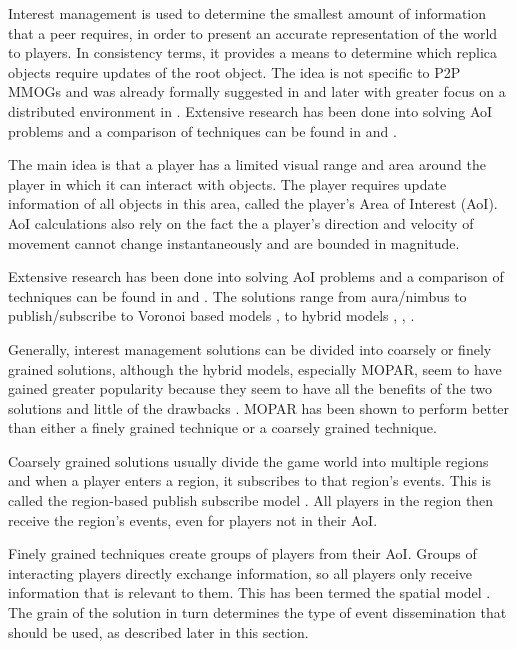 Interest management is used to determine the smallest amount of information that a peer requires, in order to present an accurate representation of
the world to players. In consistency terms, it provides a means to determine which replica objects require updates of the root object. The idea is
not specific to P2P MMOGs and was already formally suggested in \cite{First_IM} and later with greater focus on a distributed environment in \cite{Whang_agent_based_IM}. Extensive research has been done into solving AoI problems and a comparison of techniques can be found in
\cite{Boulanger_IM_compare} and \cite{IM_and_ED_survey_Krause}.

The main idea is that a player has a limited visual range and area around the player in which it can interact with objects. The player requires
update information of all objects in this area, called the player's Area of Interest (AoI). AoI calculations also rely on the fact the a player's
direction and velocity of movement cannot change instantaneously and are bounded in magnitude.

Extensive research has been done into solving AoI problems and a comparison of techniques can be found in \cite{Boulanger_IM_compare} and
\cite{IM_and_ED_survey_Krause}. The solutions range from aura/nimbus \cite{Benford_spatial_IM} to publish/subscribe  \cite{mercury_publish_subscribe} to Voronoi based models \cite{Hu_voronoi_IM},  \cite{Buyukkaya_voronoi_state_management} to hybrid models \cite{hybrid_IM}, \cite{MOPAR}, \cite{fan_mediator_paper}.

Generally, interest management solutions can be divided into coarsely or finely grained solutions, although the hybrid models, especially MOPAR, seem to have gained greater popularity because they seem to have all the benefits of the two solutions and little of the drawbacks \cite{MOPAR}. MOPAR has
been shown to perform better than either a finely grained technique or a coarsely grained technique.

Coarsely grained solutions usually divide the game world into multiple regions and when a player enters a region, it subscribes to that region's
events. This is called the region-based publish subscribe model \cite{Fan_deisgn_issues_p2p}. All players in the region then receive the region's events, even for players not in their AoI.

Finely grained techniques create groups of players from their AoI. Groups of interacting players directly exchange information, so all players
only receive information that is relevant to them. This has been termed the spatial model \cite{Fan_deisgn_issues_p2p}. The grain of the solution in
turn determines the type of event dissemination that should be used, as described later in this section.

